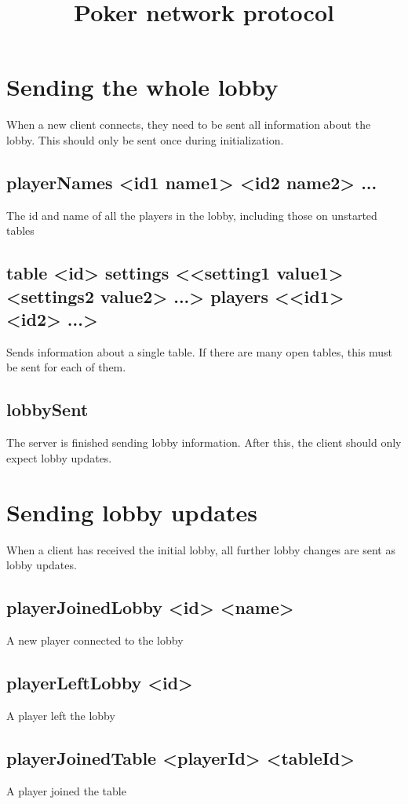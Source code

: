 \documentclass{article}
\title{Poker network protocol}
\begin{document}
\maketitle

\section{Sending the whole lobby}
When a new client connects, they need to be sent all information about the lobby. This should only be sent once during initialization.

\subsection*{playerNames <id1 name1> <id2 name2> ...}
The id and name of all the players in the lobby, including those on unstarted tables

\subsection*{table <id> settings <{}<setting1 value1> <settings2 value2> ...> players <{}<id1> <id2> ...>}
Sends information about a single table. If there are many open tables, this must be sent for each of them.

\subsection*{lobbySent}
The server is finished sending lobby information. After this, the client should only expect lobby updates.


\section{Sending lobby updates}
When a client has received the initial lobby, all further lobby changes are sent as lobby updates.

\subsection*{playerJoinedLobby <id> <name>}
A new player connected to the lobby

\subsection*{playerLeftLobby <id>}
A player left the lobby

\subsection*{playerJoinedTable <playerId> <tableId>}
A player joined the table
\end{document}
